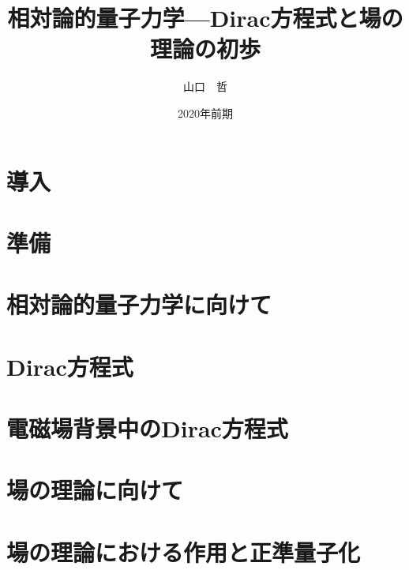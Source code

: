 \documentclass[book,paper=a4, fontsize=12pt, line_length=16cm, number_of_lines=33,dvipdfmx]{jlreq}
\title{相対論的量子力学---Dirac方程式と場の理論の初歩}
\author{山口　哲}
\date{2020年前期}
\numberwithin{equation}{section}
\begin{document}
\maketitle
\tableofcontents
\chapter{導入}



\chapter{準備}



\chapter{相対論的量子力学に向けて}



\chapter{Dirac方程式}


\chapter{電磁場背景中のDirac方程式}



\chapter{場の理論に向けて}



\chapter{場の理論における作用と正準量子化}
\end{document}
